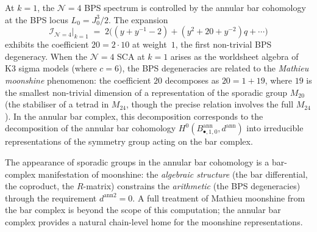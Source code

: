 \begin{remark}[$\mathcal{N}=4$ BPS states and
moonshine]%
\label{rem:n4-bps-moonshine}%
%
%
At $k=1$, the $\mathcal{N}=4$ BPS spectrum is
controlled by the annular bar cohomology at the BPS
locus $L_0 = J^3_0/2$. The expansion
\[
\mathcal{I}_{\mathcal{N}=4}|_{k=1}
\;=\;
2\bigl(
(y+y^{-1}-2)
+ (y^2+20+y^{-2})q + \cdots
\bigr)
\]
exhibits the coefficient $20 = 2\cdot 10$ at weight~$1$,
the first non-trivial BPS degeneracy. When the
$\mathcal{N}=4$ SCA at $k=1$ arises as the
worldsheet algebra of K3 sigma models (where $c=6$),
the BPS degeneracies are related to the
\emph{Mathieu moonshine} phenomenon: the coefficient
$20$ decomposes as $20 = 1 + 19$, where $19$ is the
smallest non-trivial dimension of a representation of
the sporadic group $M_{20}$ (the stabiliser of a
tetrad in $M_{24}$, though the precise relation involves
the full $M_{24}$). In the annular bar complex, this
decomposition corresponds to the decomposition of the
annular bar cohomology
$H^0(B^{\mathrm{ann}}_{\bullet,1,0},d^{\mathrm{ann}})$
into irreducible representations of the
symmetry group acting on the bar complex.

The appearance of sporadic groups in the annular bar
cohomology is a bar-complex manifestation of moonshine:
the \emph{algebraic structure} (the bar differential,
the coproduct, the $R$-matrix) constrains the
\emph{arithmetic} (the BPS degeneracies) through the
requirement $d^{\mathrm{ann}2} = 0$. A full treatment
of Mathieu moonshine from the bar complex is beyond the
scope of this computation; the annular bar complex
provides a natural chain-level home for the moonshine
representations.
\end{remark}

